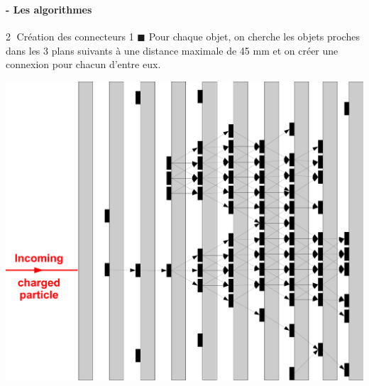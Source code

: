\documentclass[8pt]{beamer}
\begin{document}
  
  \begin{frame}
  \frametitle{\secname}
  \framesubtitle{\subsecname - Les algorithmes}
      \begin{block}{\textcircled{{\small 2}} Création des connecteurs 1}
        $\blacksquare$ Pour chaque objet, on cherche les objets proches dans les 3 plans suivants à une distance maximale de 45 mm et on créer une connexion pour chacun d'entre eux.
      \end{block}
      \begin{center}
        \includegraphics[width=0.6\linewidth]{ConnectorSeeding1.pdf} \\ ~ \\
      \end{center}
  \end{frame}
  
\end{document}
